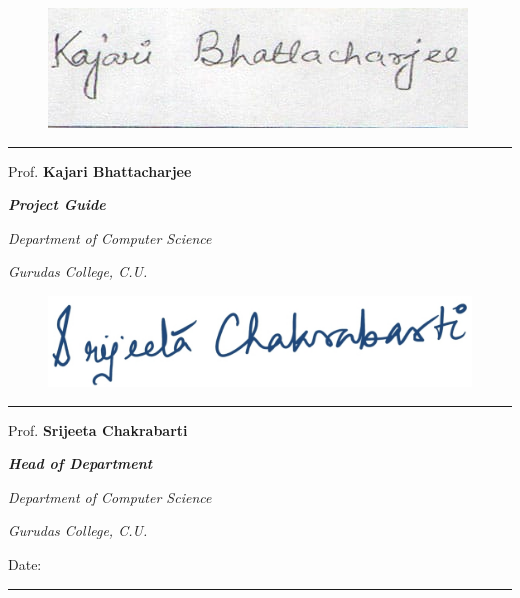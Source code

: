 \begin{multicols}{2}

	\begin{figure}[H]
		\centering
		\includegraphics[width=0.7\linewidth]{imgs/kb_sign.jpg}
		\caption*{}%
		\label{fig:kb_sign}
	\end{figure}

	\vspace{-1cm}

	\rule{7cm}{0.4pt}

	Prof. \textbf{Kajari Bhattacharjee}

	\textbf{ \textit{Project Guide}  }

	\textit{Department of Computer Science}

	\textit{Gurudas College, C.U.}

	\columnbreak

	\begin{figure}[H]
		\centering
		\includegraphics[width=0.7\linewidth]{imgs/sc_sign.jpg}
		\caption*{}%
		\label{fig:sc_sign}
	\end{figure}

	\vspace{-0.7cm}

	\rule{7cm}{0.4pt}

	Prof. \textbf{Srijeeta Chakrabarti}

	\textbf{ \textit{Head of Department}  }

	\textit{Department of Computer Science}

	\textit{Gurudas College, C.U.}

\end{multicols}

\vspace{0.5cm}

Date: \rule{5cm}{0.4pt}

\vfill
